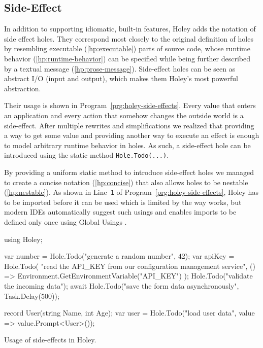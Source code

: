 \subsection{Side-Effect}
\label{sec:hole-type-side-effect}
In addition to supporting idiomatic, built-in \CS features, Holey adds the notation of side effect holes.
They correspond most closely to the original definition of holes by resembling executable (\ref{hp:executable}) parts of source code, whose runtime behavior (\ref{hp:runtime-behavior}) can be specified while being further described by a textual message (\ref{hp:prose-message}).
Side-effect holes can be seen as abstract I/O (input and output), which makes them Holey's most powerful abstraction.

Their usage is shown in Program~\ref{prg:holey-side-effects}.
Every value that enters an application and every action that somehow changes the outside world is a side-effect.
After multiple rewrites and simplifications we realized that providing a way to get some value and providing another way to execute an effect is enough to model arbitrary runtime behavior in holes.
As such, a side-effect hole can be introduced using the static method \verb|Hole.Todo(...)|.

By providing a uniform static method to introduce side-effect holes we managed to create a concise notation (\ref{hp:concise}) that also allows holes to be nestable (\ref{hp:nestable}).
As shown in Line~\verb|1| of Program~\ref{prg:holey-side-effects}, Holey has to be imported before it can be used which is limited by the way \CS works, but modern IDEs automatically suggest such usings and  enables imports to be defined only once using Global Usings \cite{koch_global_2021}.

\begin{program}[ht]
\begin{CsCode}
using Holey;

var number = Hole.Todo("generate a random number", 42);
var apiKey = Hole.Todo(
	"read the API_KEY from our configuration management service",
	() => Environment.GetEnvironmentVariable("API_KEY")
);
Hole.Todo("validate the incoming data");
await Hole.Todo("save the form data asynchronously", Task.Delay(500));

record User(string Name, int Age);
var user = Hole.Todo("load user data", value => value.Prompt<User>());
\end{CsCode}
\caption{Usage of side-effects in Holey.}
\label{prg:holey-side-effects}
\end{program}

